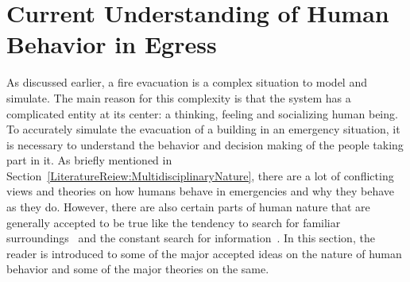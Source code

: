 \section{Current Understanding of Human Behavior in Egress}
\label{LiteratureReview:CurrentUnderstanding}
As discussed earlier, a fire evacuation is a complex situation to model and simulate. The main reason for this complexity is that the system has a complicated entity at its center: a thinking, feeling and socializing human being. To accurately simulate the evacuation of a building in an emergency situation, it is necessary to understand the behavior and decision making of the people taking part in it. As briefly mentioned in Section~\ref{LiteratureReiew:MultidisciplinaryNature}, there are a lot of conflicting views and theories on how humans behave in emergencies and why they behave as they do. However, there are also certain parts of human nature that are generally accepted to be true like the tendency to search for familiar surroundings~\cite{Mawson:2005tq,Paulsen:1984ti,Ramachandran:1990wj,Sandberg:1997tw} and the constant search for information~\cite{Proulx:2003tc,Tong:1985wn,Ozel:2001tn,Sime:1983uy}. In this section, the reader is introduced to some of the major accepted ideas on the nature of human behavior and some of the major theories on the same.

